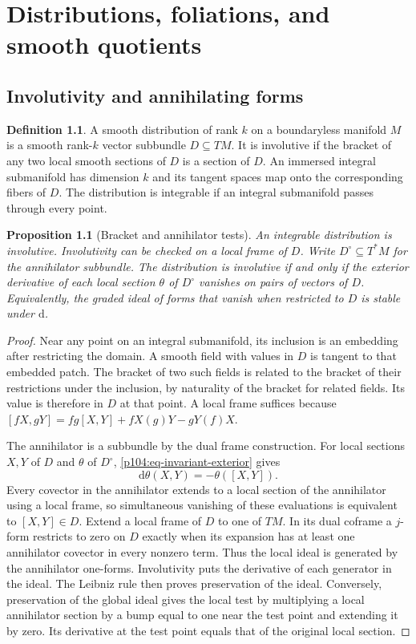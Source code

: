 \documentclass[11pt,oneside,openany]{book}
\newtheorem{proposition}[theorem]{Proposition}
\theoremstyle{definition}
\newtheorem{definition}[theorem]{Definition}
\theoremstyle{remark}
\newcommand{\dd}{\mathrm d}
\begin{document}
\chapter{Distributions, foliations, and smooth quotients}

\section{Involutivity and annihilating forms}

\begin{definition}
A smooth distribution of rank \(k\) on a boundaryless manifold \(M\) is a smooth rank-\(k\) vector subbundle \(D\subseteq TM\). It is involutive if the bracket of any two local smooth sections of \(D\) is a section of \(D\). An immersed integral submanifold has dimension \(k\) and its tangent spaces map onto the corresponding fibers of \(D\). The distribution is integrable if an integral submanifold passes through every point.
\end{definition}

\begin{proposition}[Bracket and annihilator tests]
\label{p104:M08.01}
An integrable distribution is involutive. Involutivity can be checked on a local frame of \(D\). Write \(D^\circ\subseteq T^*M\) for the annihilator subbundle. The distribution is involutive if and only if the exterior derivative of each local section \(\theta\) of \(D^\circ\) vanishes on pairs of vectors of \(D\). Equivalently, the graded ideal of forms that vanish when restricted to \(D\) is stable under \(\dd\).
\end{proposition}

\begin{proof}
Near any point on an integral submanifold, its inclusion is an embedding after restricting the domain. A smooth field with values in \(D\) is tangent to that embedded patch. The bracket of two such fields is related to the bracket of their restrictions under the inclusion, by naturality of the bracket for related fields. Its value is therefore in \(D\) at that point. A local frame suffices because
\([fX,gY]=fg[X,Y]+fX(g)Y-gY(f)X\).

The annihilator is a subbundle by the dual frame construction. For local sections \(X,Y\) of \(D\) and \(\theta\) of \(D^\circ\), \eqref{p104:eq-invariant-exterior} gives
\[
 \dd\theta(X,Y)=-\theta([X,Y]).
\]
Every covector in the annihilator extends to a local section of the annihilator using a local frame, so simultaneous vanishing of these evaluations is equivalent to \([X,Y]\in D\). Extend a local frame of \(D\) to one of \(TM\). In its dual coframe a \(j\)-form restricts to zero on \(D\) exactly when its expansion has at least one annihilator covector in every nonzero term. Thus the local ideal is generated by the annihilator one-forms. Involutivity puts the derivative of each generator in the ideal. The Leibniz rule then proves preservation of the ideal. Conversely, preservation of the global ideal gives the local test by multiplying a local annihilator section by a bump equal to one near the test point and extending it by zero. Its derivative at the test point equals that of the original local section.
\end{proof}
\end{document}
